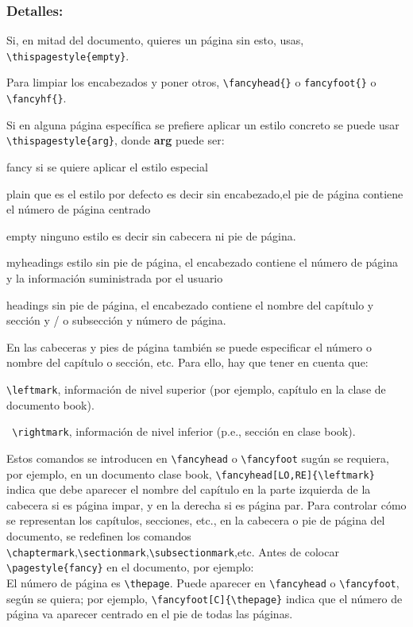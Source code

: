 \subsubsection{Detalles:}
\begin{lista}
\item Si, en mitad del documento, quieres un página sin esto, usas, \lstinline+\thispagestyle{empty}+. 
\item Para limpiar los encabezados y poner otros, \lstinline+\fancyhead{}+ o \lstinline+fancyfoot{}+ o \lstinline+\fancyhf{}+.
\end{lista}
Si en alguna página específica se prefiere aplicar un estilo concreto se puede
usar \lstinline+\thispagestyle{arg}+, donde  \textbf{arg} puede ser:
\begin{lista}
\item fancy si se quiere aplicar el estilo especial
\item plain  que es el estilo por defecto es decir sin encabezado,el  pie de página contiene el número de página centrado
\item empty ninguno estilo es decir sin cabecera ni pie de página.
\item myheadings estilo sin pie de página, el encabezado contiene el número de página y la información suministrada por el usuario
\item headings sin pie de página, el encabezado contiene el nombre del capítulo y sección y / o subsección y número de página.
\end{lista}
En las cabeceras y pies de página también se puede  especificar el
número o nombre del capítulo o sección, etc. Para ello, hay que tener en cuenta que:
\begin{lista}
\item \lstinline+\leftmark+, información de nivel superior (por ejemplo, capítulo en la clase de documento book).
\item \lstinline+ \rightmark+, información de nivel inferior (p.e., sección en clase book).
\end{lista}
Estos comandos se introducen en \lstinline+\fancyhead+ o \lstinline+\fancyfoot+ sugún se requiera, por ejemplo, en un documento clase book, \lstinline+\fancyhead[LO,RE]{\leftmark}+ indica que debe aparecer el nombre del capítulo en la parte izquierda de la cabecera si es página impar, y en la derecha si es página par. Para controlar cómo se representan los capítulos, secciones, etc., en la cabecera o pie de página  del documento, se redefinen los comandos \lstinline+\chaptermark+,\lstinline+\sectionmark+,\lstinline+\subsectionmark+,etc. Antes de colocar \lstinline+\pagestyle{fancy}+ en el documento, por ejemplo:\\
El número de página es \lstinline+\thepage+. Puede aparecer en \lstinline+\fancyhead+ o \lstinline+\fancyfoot+, según se quiera; por ejemplo, \lstinline+\fancyfoot[C]{\thepage}+ indica que el número de página va aparecer centrado en el pie de todas las páginas.
